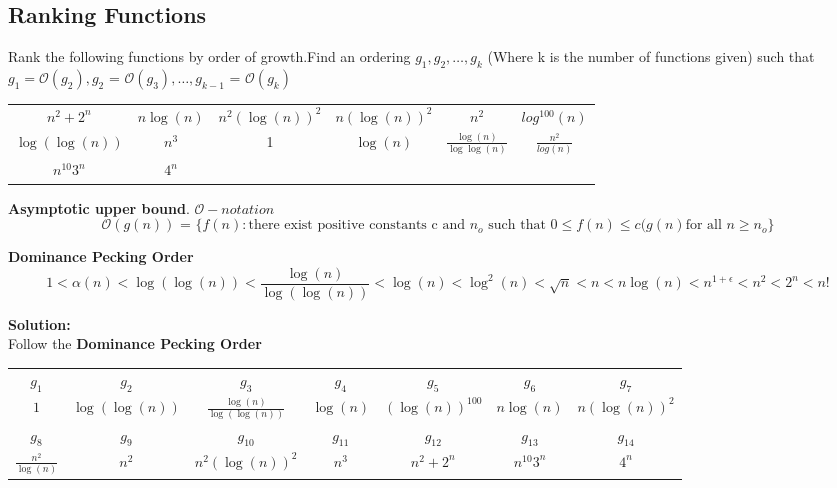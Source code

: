\documentclass[11pt,fleqn]{book}
\begin{document}
\subsection{Ranking Functions}
\vspace{1em}
\begin{example}
Rank  the  following  functions  by  order  of  growth.Find  an  ordering $g_1, g_2, \dots , g_k$ (Where k is the number of functions given) such that $g_1 = \mathcal{O}(g_2), g_2$ = $\mathcal{O}(g_3), \dots, g_{k - 1}$ = $\mathcal{O}(g_{k}) $  
\begin{center}
    \begin{tabular}{c|c|c|c|c|c}
        $n^2 + 2^n$  &  $n\log(n)$ & $n^2(\log(n))^2$ & $n(\log(n))^2$ & $n^2$ & $log^{100}(n)$\\
        $\log(\log(n))$ & $n^3$ & 1 & $\log(n)$ & $\frac{\log(n)}{\log\log(n)}$ & $\frac{n^2}{log(n)}$\\
        $n^{10}3^{n}$ & $4^n$ & & & &
    \end{tabular}
\end{center}
\end{example}
\begin{definition}
\textbf{Asymptotic upper bound}. $\mathcal{O} - notation$
    $$\mathcal{O}(g(n)) \text{ = } \{f(n) : \text{there exist positive constants c and } n_o \text{ such that } 
    0 \leq f(n) \leq c(g(n) \text{for all } n \geq n_o\}$$
\end{definition}
\begin{definition}
\textbf{Dominance Pecking Order} 
$$1 < \alpha(n) < \log(\log(n)) < \frac{\log(n)}{\log(\log(n))} < \log(n) < \log^2(n) < \sqrt{n} < n < n\log(n) < n^{1 + \epsilon} < n^2 < 2^n < n!$$ 
\end{definition}
\textbf{Solution:} \\
Follow the \textbf{Dominance Pecking Order} 
\begin{center}
\begin{tabular}{|c|c|c|c|c|c|c|}
    \hline
     $g_1$ & $g_2$ & $g_3$ & $g_4$ & $g_5$ & $g_6$ & $g_7$\\
     $1$ & $\log(\log(n))$ & $\frac{\log(n)}{\log(\log(n))}$ & $\log(n)$ & $(\log(n))^{100}$ & $n\log(n)$ & $n(\log(n))^2$\\
     \hline
    $g_8$ & $g_9$ & $g_{10}$ & $g_{11}$ & $g_{12}$ & $g_{13}$ & $g_{14}$ \\
    $\frac{n^2}{\log(n)}$ & $n^2$ & $n^2(\log(n))^2$ & $n^3$ & $n^2 + 2^n$ & $n^{10}3^n$ & $4^n$ \\
    \hline 
\end{tabular}
\end{center}
\end{document}
